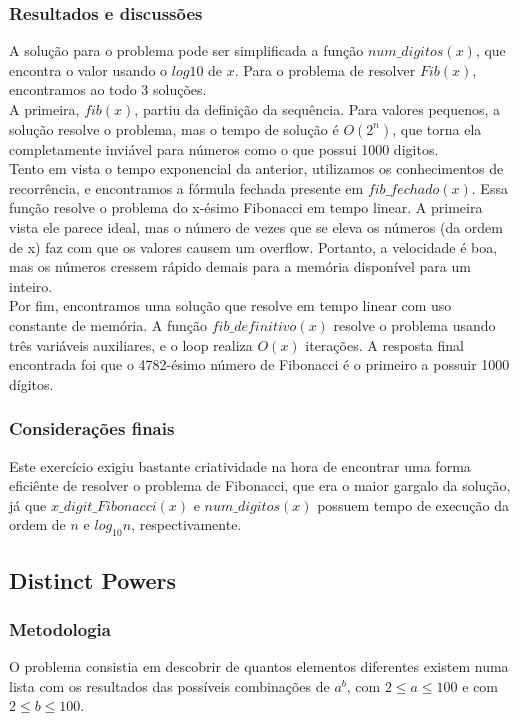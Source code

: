 \documentclass{article}
\begin{document}
        \subsubsection{Resultados e discussões}
        A solução para o problema pode ser simplificada a função $num\_digitos(x)$, que encontra o valor usando o $log10$ de $x$. Para o problema de resolver $Fib(x)$, encontramos ao todo 3 soluções.\\
        A primeira, $fib(x)$, partiu da definição da sequência. Para valores pequenos, a solução resolve o problema, mas o tempo de solução é $O(2^n)$, que torna ela completamente inviável para números como o que possui 1000 digitos.\\
        Tento em vista o tempo exponencial da anterior, utilizamos os conhecimentos de recorrência, e encontramos a fórmula fechada presente em $fib\_fechado(x)$. Essa função resolve o problema do x-ésimo Fibonacci em tempo linear. A primeira vista ele parece ideal, mas o número de vezes que se eleva os números (da ordem de x) faz com que os valores causem um overflow. Portanto, a velocidade é boa, mas os números cressem rápido demais para a memória disponível para um inteiro.\\
        Por fim, encontramos uma solução que resolve em tempo linear com uso constante de memória. A função $fib\_definitivo(x)$ resolve o problema usando três variáveis auxiliares, e o loop realiza $O(x)$ iterações.
        A resposta final encontrada foi que o 4782-ésimo número de Fibonacci é o primeiro a possuir 1000 dígitos.
        
        \subsubsection{Considerações finais}
        Este exercício exigiu bastante criatividade na hora de encontrar uma forma eficiênte de resolver o problema de Fibonacci, que era o maior gargalo da solução, já que $x\_digit\_Fibonacci(x)$ e $num\_digitos(x)$ possuem tempo de execução da ordem de $n$ e $log_{10} n$, respectivamente.
        
    \subsection{Distinct Powers}
        
        \subsubsection{Metodologia}
        O problema consistia em descobrir de quantos elementos diferentes existem numa lista com os resultados das possíveis combinações de $a^b$, com $2 \leq a \leq 100$ e com $2 \leq b \leq 100$.
        
\end{document}
